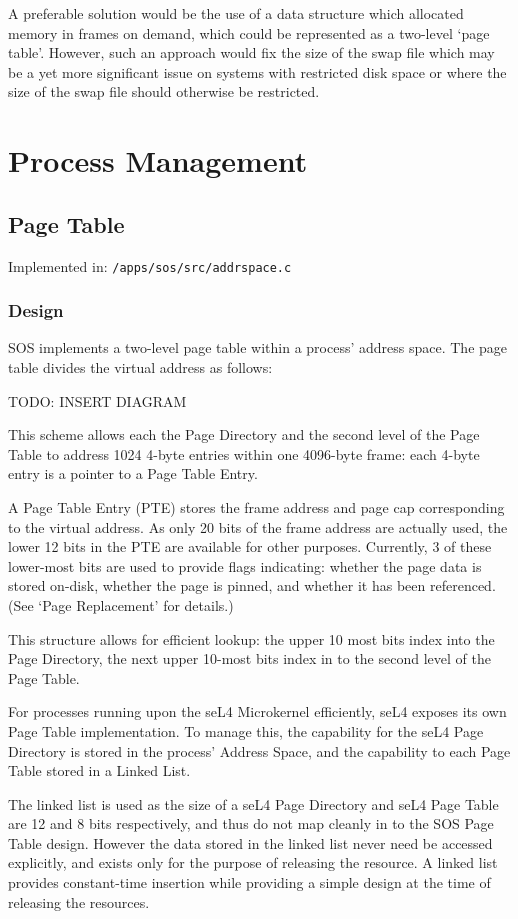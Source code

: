\documentclass[a4paper,12pt]{article}
\begin{document}
A preferable solution would be the use of a data structure which allocated
memory in frames on demand, which could be represented as a two-level `page
table'.  However, such an approach would fix the size of the swap file which
may be a yet more significant issue on systems with restricted disk space or
where the size of the swap file should otherwise be restricted.

\section{Process Management}
\subsection{Page Table}
Implemented in: \texttt{/apps/sos/src/addrspace.c}

\subsubsection{Design}
SOS implements a two-level page table within a process' address space.  The
page table divides the virtual address as follows:

TODO: INSERT DIAGRAM

This scheme allows each the Page Directory and the second level of the Page
Table to address 1024 4-byte entries within one 4096-byte frame: each 4-byte
entry is a pointer to a Page Table Entry.

A Page Table Entry (PTE) stores the frame address and page cap corresponding
to the virtual address.  As only 20 bits of the frame address are actually
used, the lower 12 bits in the PTE are available for other purposes.
Currently, 3 of these lower-most bits are used to provide flags indicating:
whether the page data is stored on-disk, whether the page is pinned, and
whether it has been referenced.  (See `Page Replacement' for details.)

This structure allows for efficient lookup: the upper 10 most bits index into
the Page Directory, the next upper 10-most bits index in to the second level
of the Page Table.

For processes running upon the seL4 Microkernel efficiently, seL4 exposes its
own Page Table implementation.  To manage this, the capability for the seL4
Page Directory is stored in the process' Address Space, and the capability to
each Page Table stored in a Linked List.

The linked list is used as the size of a seL4 Page Directory and seL4 Page
Table are 12 and 8 bits respectively, and thus do not map cleanly in to the
SOS Page Table design.  However the data stored in the linked list never need
be accessed explicitly, and exists only for the purpose of releasing the
resource.  A linked list provides constant-time insertion while providing a
simple design at the time of releasing the resources.
\end{document}
